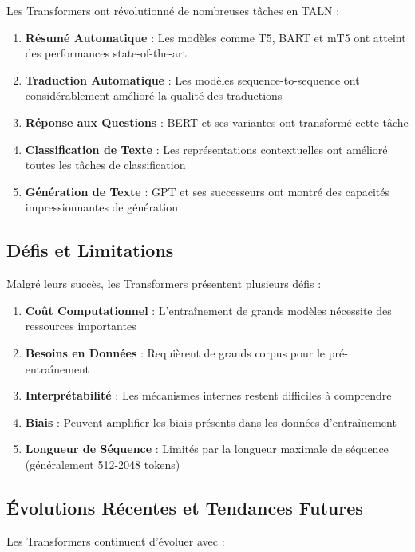 Les Transformers ont révolutionné de nombreuses tâches en TALN :

\begin{enumerate}
    \item \textbf{Résumé Automatique} : Les modèles comme T5, BART et mT5 ont atteint des performances state-of-the-art
    \item \textbf{Traduction Automatique} : Les modèles sequence-to-sequence ont considérablement amélioré la qualité des traductions
    \item \textbf{Réponse aux Questions} : BERT et ses variantes ont transformé cette tâche
    \item \textbf{Classification de Texte} : Les représentations contextuelles ont amélioré toutes les tâches de classification
    \item \textbf{Génération de Texte} : GPT et ses successeurs ont montré des capacités impressionnantes de génération
\end{enumerate}

\subsection{Défis et Limitations}

Malgré leurs succès, les Transformers présentent plusieurs défis :

\begin{enumerate}
    \item \textbf{Coût Computationnel} : L'entraînement de grands modèles nécessite des ressources importantes
    \item \textbf{Besoins en Données} : Requièrent de grands corpus pour le pré-entraînement
    \item \textbf{Interprétabilité} : Les mécanismes internes restent difficiles à comprendre
    \item \textbf{Biais} : Peuvent amplifier les biais présents dans les données d'entraînement
    \item \textbf{Longueur de Séquence} : Limités par la longueur maximale de séquence (généralement 512-2048 tokens)
\end{enumerate}

\subsection{Évolutions Récentes et Tendances Futures}

Les Transformers continuent d'évoluer avec :


